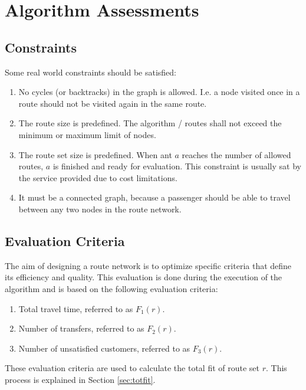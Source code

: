 \section{Algorithm Assessments}

\subsection{Constraints}
\label{sec:algoConstraints}
Some real world constraints should be satisfied:
\begin{enumerate}
\item \label{itm:constraintCycles} No cycles (or backtracks) in the graph is allowed. I.e. a node visited once in a route should not be visited again in the same route. 
\item \label{itm:constraintRouteSize} The route size is predefined. The algorithm / routes shall not exceed the minimum or maximum limit of nodes.
\item \label{itm:constraintRouteSetSize} The route set size is predefined. When ant $a$ reaches the number of allowed routes, $a$ is finished and ready for evaluation. This constraint is usually sat by the service provided due to cost limitations.
\item \label{itm:criteriaConnectedGraph} It must be a connected graph, because a passenger should be able to travel between any two nodes in the route network.
\end{enumerate}

\subsection{Evaluation Criteria} 
The aim of designing a route network is to optimize specific criteria that define its efficiency and quality. This evaluation is done during the execution of the algorithm and is based on the following evaluation criteria:
\begin{enumerate}
\item \label{itm:criteriaTotalTravelTime} Total travel time, referred to as $F_1(r)$.
\item \label{itm:f2} Number of transfers, referred to as $F_2(r)$.
\item Number of unsatisfied customers, referred to as $F_3(r)$. 
\end{enumerate}
These evaluation criteria are used to calculate the total fit of route set $r$. This process is explained in Section \vref{sec:totfit}.



